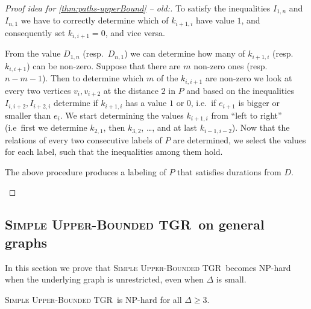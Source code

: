 \documentclass[a4paper,UKenglish,cleveref, autoref, thm-restate]{lipics-v2021}
\newcommand{\deltaUpperBound}{\textsc{Simple Upper-Bounded TGR}}
\begin{document}
\begin{proof}[Proof idea for \cref{thm:paths-upperBound} -- old:]
	To satisfy the inequalities $I_{1,n}$ and $I_{n,1}$ we have to correctly determine which of $k_{i+1,i}$ have value $1$, and consequently set $k_{i,i+1} = 0$,
	and vice versa.
	
	From the value $D_{1,n}$ (resp.~$D_{n,1}$) we can determine how many of $k_{i+1,i}$ (resp.$k_{i,i+1}$) can be non-zero. Suppose that there are $m$ non-zero ones (resp.~$n-m-1$).
	Then to determine which $m$ of the $k_{i,i+1}$ are non-zero we look at every two vertices $v_i, v_{i+2}$ at the distance $2$ in $P$ 
	and based on the inequalities $I_{i,i+2}, I_{i+2,i}$ determine if $k_{i+1,i}$ has a value $1$ or $0$,
	i.e.~if $e_{i+1}$ is bigger or smaller than $e_i$.
	We start determining the values $k_{i+1,i}$ from ``left to right'' (i.e~first we determine $k_{2,1}$, then $k_{3,2}$, \dots, and at last $k_{i-1,i-2}$).
	Now that the relations of every two consecutive labels of $P$ are determined, 
	we select the values for each label, such that the inequalities among them hold.
	\begin{claim}
		The above procedure produces a labeling of $P$ that satisfies durations from $D$.
	\end{claim}
\end{proof}

\subsection{\deltaUpperBound\ on general graphs}
In this section we prove that \deltaUpperBound\ becomes NP-hard when the underlying graph is unrestricted, even when $\Delta$ is small.

\begin{theorem}\label{thm:NP-upperBound}
	\deltaUpperBound\ is NP-hard for all $\Delta \geq 3$.
\end{theorem}
\end{document}
